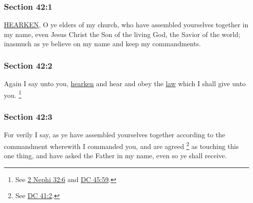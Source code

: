 	\subsubsection{Section 42:1} %
		\label{DC42-1}

		\hyperref[HEARKEN]{HEARKEN}, O ye elders of my church, who have assembled yourselves together in my name, even Jesus Christ the Son of the living God, the Savior of the world; inasmuch as ye believe on my name and keep my commandments.


	\subsubsection{Section 42:2} %
		\label{DC42-2}

		Again I say unto you, \hyperref[HEARKEN]{hearken} and hear and obey the \hyperref[LAW]{law} which I shall give unto you.%
			\footnote{%
				See \hyperref[2NEPHI-32-6]{2 Nephi 32:6} and \hyperref[DC45-59]{DC 45:59}.
				}


	\subsubsection{Section 42:3} %
		\label{DC42-3}

		For verily I say, as ye have assembled yourselves together according to the commandment wherewith I commanded you, and are agreed%
			\footnote{%
				See \hyperref[DC41-2]{DC 41:2}.
				}
		as touching this one thing, and have asked the Father in my name, even so ye shall receive.

